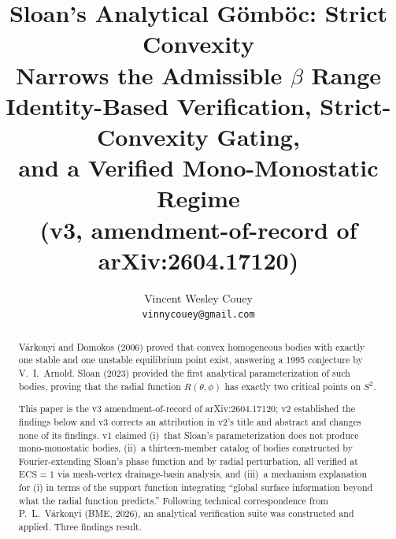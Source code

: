 \documentclass[11pt,a4paper]{article}
\title{%
  \textbf{Sloan's Analytical G\"omb\"oc: Strict Convexity\\
  Narrows the Admissible $\beta$ Range}\\[8pt]
  \large Identity-Based Verification, Strict-Convexity Gating,\\
  and a Verified Mono-Monostatic Regime\\[4pt]
  \normalsize (v3, amendment-of-record of arXiv:2604.17120)%
}
\author{
  Vincent Wesley Couey \\[4pt]
  \small \texttt{vinnycouey@gmail.com} \\
}
\date{}
\begin{document}
\maketitle

\begin{abstract}
V\'arkonyi and Domokos (2006) proved that convex homogeneous bodies
with exactly one stable and one unstable equilibrium point exist,
answering a 1995 conjecture by V.~I.~Arnold. Sloan (2023) provided
the first analytical parameterization of such bodies, proving that
the radial function $R(\theta,\phi)$ has exactly two critical points
on $S^2$.

This paper is the v3 amendment-of-record of arXiv:2604.17120; v2
established the findings below and v3 corrects an attribution in
v2's title and abstract and changes none of its findings. v1
claimed (i)~that Sloan's parameterization does not produce
mono-monostatic bodies, (ii)~a thirteen-member catalog of bodies
constructed by Fourier-extending Sloan's phase function and by
radial perturbation, all verified at $\mathrm{ECS}=1$ via
mesh-vertex drainage-basin analysis, and (iii)~a mechanism
explanation for (i) in terms of the support function integrating
``global surface information beyond what the radial function
predicts.'' Following technical correspondence from P.~L.~V\'arkonyi
(BME, 2026), an analytical verification suite was constructed and
applied. Three findings result.


\end{abstract}
\end{document}
